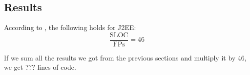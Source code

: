 \subsection{Results} %
\label{sub:results}
According to \cite{bib:fp}, the following holds for J2EE:
\begin{equation}
    \frac{\mbox{SLOC}}{\mbox{FPs}} = 46
\end{equation}

If we sum all the results we got from the previous sections and multiply it by 46, we get ??? lines of code.
